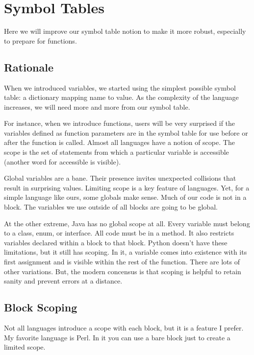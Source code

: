 \chapter{Symbol Tables}

Here we will improve our symbol table notion to make it more robust,
especially to prepare for functions.

\section{Rationale}

When we introduced variables, we started using the simplest possible
symbol table: a dictionary mapping name to value. As the complexity
of the language increases, we will need more and more from our symbol
table.

For instance, when we introduce functions, users will be very surprised
if the variables defined as function parameters are in the symbol
table for use before or after the function is called. Almost all languages
have a notion of scope. The scope is the set of statements from which
a particular variable is accessible (another word for accessible is visible).

Global variables are a bane. Their presence invites unexpected collisions
that result in surprising values. Limiting scope is a key feature of
languages. Yet, for a simple language like ours, some globals make sense.
Much of our code is not in a block. The variables we use outside of all
blocks are going to be global.

At the other extreme, Java has no global scope at all. Every variable
must belong to a class, enum, or interface. All code must be in a
method. It also restricts variables declared within a block to that
block. Python doesn't have these limitations, but it still has
scoping. In it, a variable comes into existence with its first assignment
and is visible within the rest of the function. There are lots of other
variations. But, the modern concensus is that scoping is helpful to
retain sanity and prevent errors at a distance.

\section{Block Scoping}

Not all languages introduce a scope with each block, but it is a feature
I prefer. My favorite language is Perl. In it you can use a bare
block just to create a limited scope.

